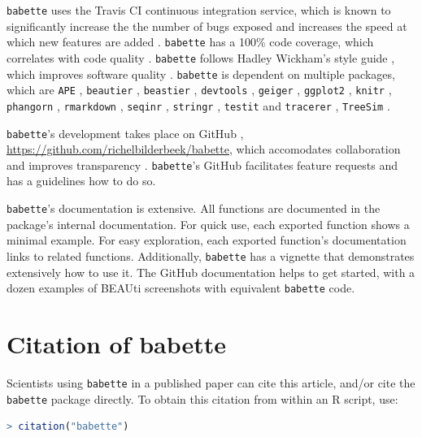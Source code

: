 \documentclass{article}
\begin{document}
\verb;babette; uses the Travis CI \cite{travis} 
continuous integration service, which is known to significantly 
increase the the number of bugs exposed \cite{vasilescu2015} and increases
the speed at which new features are added \cite{vasilescu2015}.
\verb;babette; has a 100\% code coverage, which correlates with code quality \cite{horgan1994,del1995correlation}. 
\verb;babette; follows Hadley Wickham's style guide \cite{style_guide}, which improves software quality \cite{fang2001}.
\verb;babette; is dependent on multiple packages, which are 
\verb;APE; \cite{APE}, 
\verb;beautier; \cite{beautier},
\verb;beastier; \cite{beastier},
\verb;devtools; \cite{devtools},
\verb;geiger; \cite{GEIGER},
\verb;ggplot2; \cite{ggplot2},
\verb;knitr; \cite{knitr},
\verb;phangorn; \cite{phangorn},
\verb;rmarkdown; \cite{rmarkdown},
\verb;seqinr; \cite{seqinr},
\verb;stringr; \cite{stringr},
\verb;testit; \cite{testit} and 
\verb;tracerer; \cite{tracerer},
\verb;TreeSim; \cite{TreeSim}.

\verb;babette;'s development takes place on GitHub \cite{github},
\url{https://github.com/richelbilderbeek/babette}, 
which accomodates collaboration \cite{perez2016ten} 
and improves transparency \cite{gorgolewski2016practical}.
\verb;babette;'s GitHub facilitates feature requests and has a guidelines how to do so.

\verb;babette;'s documentation is extensive. All functions are documented
in the package's internal documentation. For quick use, 
each exported function shows a minimal example. 
For easy exploration, each exported function's documentation links to related functions.
Additionally, \verb;babette; has a vignette that demonstrates extensively how
to use it. The GitHub documentation helps to get started, with a dozen examples 
of BEAUti screenshots with equivalent \verb;babette; code.

\section{Citation of babette}

Scientists using \verb;babette; in a published paper can cite this
article, and/or cite the \verb;babette; package 
directly. To obtain this citation from within an R script, use:

\begin{lstlisting}[language=R]
> citation("babette")
\end{lstlisting}




\begin{thebibliography}{}

\end{thebibliography}
\end{document}
